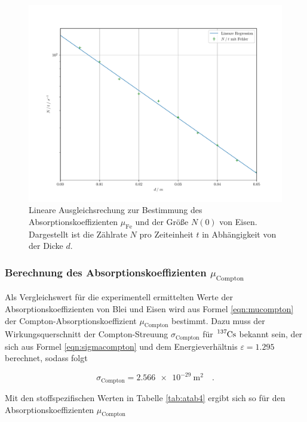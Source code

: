 \FloatBarrier
\begin{figure}[h]
    \centering
    \includegraphics[width=13.5cm]{content/eisen.pdf}
    \caption{Lineare Ausgleichsrechung zur Bestimmung des Absorptionskoeffizienten $\mu_\text{Fe}$ und der Größe $N\left(0\right)$ von Eisen. 
    Dargestellt ist die Zählrate $N$ pro Zeiteinheit $t$ in Abhängigkeit von der Dicke $d$.}
    \label{fig:afig2}
\end{figure}
\FloatBarrier

\subsubsection{Berechnung des Absorptionskoeffizienten \texorpdfstring{$\mu_\text{Compton}$}{}}

Als Vergleichswert für die experimentell ermittelten Werte der Absorptionskoeffizienten von Blei und Eisen wird aus
Formel \eqref{eqn:mucompton} der Compton-Absorptionskoeffizient $\mu_\text{Compton}$ bestimmt. Dazu muss der Wirkungsquerschnitt
der Compton-Streuung $\sigma_\text{Compton}$ für $\ce{^{137}Cs}$ bekannt sein, der sich aus Formel \eqref{eqn:sigmacompton} und dem 
Energieverhältnis $\varepsilon = 1.295$ berechnet, sodass folgt

\begin{equation*}
    \sigma_\text{Compton} = \SI{2,566e-29}{\meter\squared} \quad .
\end{equation*}

Mit den stoffspezifischen Werten in Tabelle \ref{tab:atab4} ergibt sich so für den Absorptionskoeffizienten $\mu_\text{Compton}$


